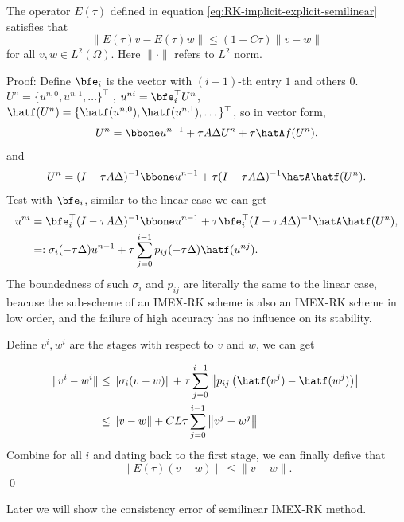 \begin{theorem}
    The operator $E(\tau)$ defined in equation \eqref{eq:RK-implicit-explicit-semilinear} 
    satisfies that 
    $$\|E(\tau)v - E(\tau)w\| \leq (1+C\tau) \|v-w\|$$
    for all $v, w \in L^2(\Omega)$. Here $\|\cdot\|$ refers to $L^2$ norm.  
\end{theorem}

Proof: 
Define $\bfe_i$ is the vector with $(i+1)$-th entry $1$ and others $0$. 
$U^n = \{u^{n,0}, u^{n,1}, \dots\}^\top$ , $u^{ni}= \bfe_i^\top U^n$, 
$\hatf(U^n) = \{\hatf(u^{n,0}), \hatf(u^{n,1}), \dots\}^\top$, so in vector form, 
\begin{equation}\label{eq:RK-implicit-explicit-semilinear-vector}
    U^n = \bbone u^{n-1} + \tau A \Delta U^n + \tau \hatA f(U^n),
\end{equation}
and
\begin{equation}
    U^n = (I-\tau A \Delta)^{-1}\bbone u^{n-1} + \tau (I-\tau A \Delta)^{-1} \hatA \hatf(U^n).
\end{equation}
Test with $\bfe_i$, similar to the linear case we can get
\begin{align*}
    u^{ni} & =  \bfe_i^\top(I-\tau A \Delta)^{-1}\bbone u^{n-1} + \tau  \bfe_i^\top(I-\tau A \Delta)^{-1} \hatA \hatf(U^n),\\
        & =:  \sigma_i(-\tau\Delta) u^{n-1} + \tau\sum_{j=0}^{i-1} p_{ij}(-\tau\Delta) \hatf(u^{nj}).     
\end{align*}
The boundedness of such $\sigma_i$ and $p_{ij}$ are literally the same to the linear case, 
beacuse the sub-scheme of an IMEX-RK scheme is also an IMEX-RK scheme in low order, 
and the failure of high accuracy has no influence on its stability. 

Define $v^i, w^i$ are the stages with respect to $v$ and $w$, we can get 

\begin{align*}\|v^i - w^i\| &\leq \| \sigma_i(v-w)\| + \tau\sum_{j=0}^{i-1} \left\|p_{ij} \left(\hatf(v^j)-\hatf(w^j) \right)\right\|\\
    &\leq  \|v-w\| + CL \tau\sum_{j=0}^{i-1} \left\|v^j-w^j\right\|
\end{align*}
Combine for all $i$ and dating back to the first stage, we can finally defive that 
$$\|E(\tau)(v-w)\| \leq \|v-w\|. $$
\qed

Later we will show the consistency error of semilinear IMEX-RK method. 


